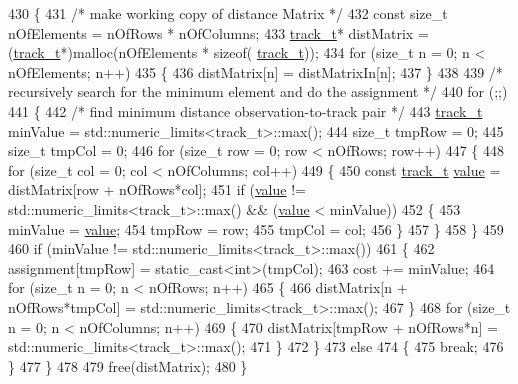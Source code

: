 \begin{DoxyCode}
430 \{
431     \textcolor{comment}{/* make working copy of distance Matrix */}
432     \textcolor{keyword}{const} \textcolor{keywordtype}{size\_t} nOfElements = nOfRows * nOfColumns;
433     \mbox{\hyperlink{defines_8h_a7ce9c8817b42ab418e61756f579549ab}{track\_t}}* distMatrix = (\mbox{\hyperlink{defines_8h_a7ce9c8817b42ab418e61756f579549ab}{track\_t}}*)malloc(nOfElements * \textcolor{keyword}{sizeof}(
      \mbox{\hyperlink{defines_8h_a7ce9c8817b42ab418e61756f579549ab}{track\_t}}));
434     \textcolor{keywordflow}{for} (\textcolor{keywordtype}{size\_t} n = 0; n < nOfElements; n++)
435     \{
436         distMatrix[n] = distMatrixIn[n];
437     \}
438 
439     \textcolor{comment}{/* recursively search for the minimum element and do the assignment */}
440     \textcolor{keywordflow}{for} (;;)
441     \{
442         \textcolor{comment}{/* find minimum distance observation-to-track pair */}
443         \mbox{\hyperlink{defines_8h_a7ce9c8817b42ab418e61756f579549ab}{track\_t}} minValue = std::numeric\_limits<track\_t>::max();
444         \textcolor{keywordtype}{size\_t} tmpRow = 0;
445         \textcolor{keywordtype}{size\_t} tmpCol = 0;
446         \textcolor{keywordflow}{for} (\textcolor{keywordtype}{size\_t} row = 0; row < nOfRows; row++)
447         \{
448             \textcolor{keywordflow}{for} (\textcolor{keywordtype}{size\_t} col = 0; col < nOfColumns; col++)
449             \{
450                 \textcolor{keyword}{const} \mbox{\hyperlink{defines_8h_a7ce9c8817b42ab418e61756f579549ab}{track\_t}} \mbox{\hyperlink{struct_g_m_l__token_a50b20988e3fe419332313e8d9e02c775}{value}} = distMatrix[row + nOfRows*col];
451                 \textcolor{keywordflow}{if} (\mbox{\hyperlink{struct_g_m_l__token_a50b20988e3fe419332313e8d9e02c775}{value}} != std::numeric\_limits<track\_t>::max() && (\mbox{\hyperlink{struct_g_m_l__token_a50b20988e3fe419332313e8d9e02c775}{value}} < minValue))
452                 \{
453                     minValue = \mbox{\hyperlink{struct_g_m_l__token_a50b20988e3fe419332313e8d9e02c775}{value}};
454                     tmpRow = row;
455                     tmpCol = col;
456                 \}
457             \}
458         \}
459 
460         \textcolor{keywordflow}{if} (minValue != std::numeric\_limits<track\_t>::max())
461         \{
462             assignment[tmpRow] = \textcolor{keyword}{static\_cast<}\textcolor{keywordtype}{int}\textcolor{keyword}{>}(tmpCol);
463             cost += minValue;
464             \textcolor{keywordflow}{for} (\textcolor{keywordtype}{size\_t} n = 0; n < nOfRows; n++)
465             \{
466                 distMatrix[n + nOfRows*tmpCol] = std::numeric\_limits<track\_t>::max();
467             \}
468             \textcolor{keywordflow}{for} (\textcolor{keywordtype}{size\_t} n = 0; n < nOfColumns; n++)
469             \{
470                 distMatrix[tmpRow + nOfRows*n] = std::numeric\_limits<track\_t>::max();
471             \}
472         \}
473         \textcolor{keywordflow}{else}
474         \{
475             \textcolor{keywordflow}{break};
476         \}
477     \}
478 
479     free(distMatrix);
480 \}
\end{DoxyCode}
